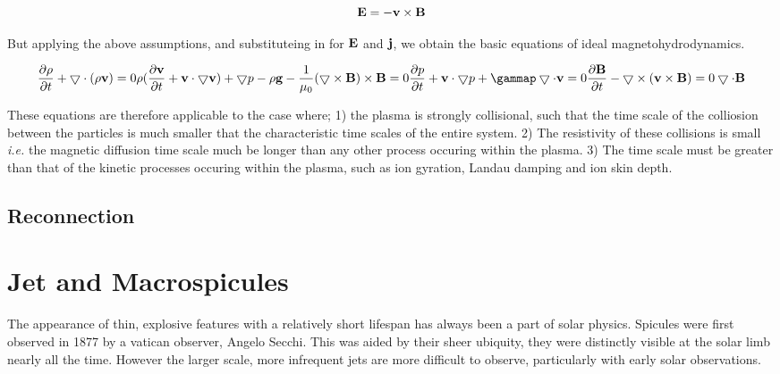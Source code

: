 \begin{equation}
	\mathbf{E} = -\mathbf{v} \times \mathbf{B}
\end{equation}

But applying the above assumptions, and substituteing in for $\mathbf{E}$ and $\mathbf{j}$, we obtain the basic equations of ideal magnetohydrodynamics.

\begin{equation}
	\pd{\rho}{t} + \del\cdot(\rho\mb{v}) = 0
	
	\rho(\pd{\mb{v}}{t} + \mb{v}\cdot\divv{\mb{v}}) + \divv{p} - \rho\mb{g} - \frac{1}{\mu_0}(\del \times \mb{B}) \times \mb{B} = 0
	
	\pd{p}{t} + \mb{v}\cdot\divv{p} + \gammap\del\cdot\mb{v} = 0
	
	\pd{\mb{B}}{t} - \del \times (\mb{v} \times \mb{B}) = 0
	
	\del\cdot\mb{B}
\end{equation}

These equations are therefore applicable to the case where; 1) the plasma is strongly collisional, such that the time scale of the colliosion between the particles is much smaller that the characteristic time scales of the entire system.
2) The resistivity of these collisions is small \emph{i.e.} the magnetic diffusion time scale much be longer than any other process occuring within the plasma.
3) The time scale must be greater than that of the kinetic processes occuring within the plasma, such as ion gyration, Landau damping and ion skin depth.









\subsection{Reconnection}

\section{Jet and Macrospicules}

The appearance of thin, explosive features with a relatively short lifespan has always been a part of solar physics.
Spicules were first observed in 1877 by a vatican observer, Angelo Secchi.
This was aided by their sheer ubiquity, they were distinctly visible at the solar limb nearly all the time.
However the larger scale, more infrequent jets are more difficult to observe, particularly with early solar observations.

